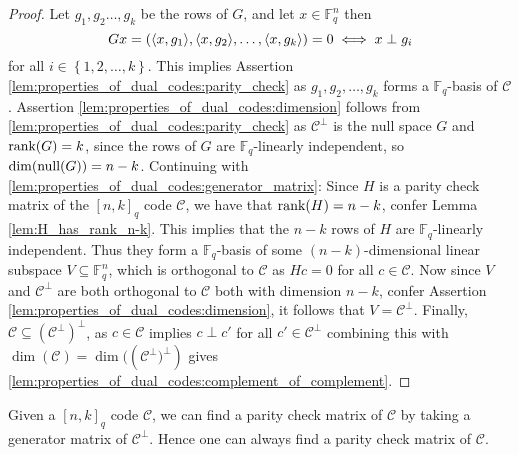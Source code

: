 \begin{proof}
  Let $g_1,g_{2} \ldots, g_{k}$ be the rows of $G$, and let $x \in \mathbb{F}_q^n$ then
  \begin{equation*}
  G x = (\langle x, g_{1}\rangle, \langle x, g_{2}\rangle, \ldots,  \langle x, g_{k}\rangle) = 0 \iff x \perp g_{i}
  \end{equation*}
  for all $i \in \left\{1, 2, \ldots, k\right\}$.
  This implies Assertion \ref{lem:properties_of_dual_codes:parity_check} as $g_{1}, g_{2}, \ldots, g_{k}$ forms a $\mathbb{F}_{q}$-basis of $\mathcal{C}$.
  Assertion \ref{lem:properties_of_dual_codes:dimension} follows from \ref{lem:properties_of_dual_codes:parity_check} as $\mathcal{C}^{\perp}$ is the null space $G$ and $\textnormal{rank}(G) = k$, since the rows of $G$ are $\mathbb{F}_q$-linearly independent, so $\dim(\textnormal{null}(G)) = n - k$.
  Continuing with \ref{lem:properties_of_dual_codes:generator_matrix}: Since $H$ is a parity check matrix of the $[n, k]_{q}$ code $\mathcal{C}$, we have that $\textnormal{rank}(H) = n - k$, confer Lemma \ref{lem:H_has_rank_n-k}. This implies that the $n -k$ rows of $H$ are $\mathbb{F}_{q}$-linearly independent. Thus they form a $\mathbb{F}_q$-basis of some $(n-k)$-dimensional linear subspace $V \subseteq \mathbb{F}_q^{n}$, which is orthogonal to $\mathcal{C}$ as $Hc = 0$ for all $c \in \mathcal{C}$. Now since $V$ and $\mathcal{C}^{\perp}$ are both orthogonal to $\mathcal{C}$ both with dimension $n - k$, confer Assertion \ref{lem:properties_of_dual_codes:dimension}, it follows that $V  = \mathcal{C}^{\perp}$.
  Finally, $\mathcal{C} \subseteq (\mathcal{C}^{\perp})^{\perp}$, as $c \in \mathcal{C}$ implies $c \perp c'$ for all $c' \in \mathcal{C}^{\perp}$ combining this with $\dim(\mathcal{C}) = \dim(\left(\mathcal{C}^{\perp})^{\perp}\right)$ gives \ref{lem:properties_of_dual_codes:complement_of_complement}.
\end{proof}


\begin{remark}
  Given a $[n, k]_{q}$ code $\mathcal{C}$, we can find a parity check matrix of $\mathcal{C}$ by taking a generator matrix of $\mathcal{C}^{\perp}$. Hence one can always find a parity check matrix of $\mathcal{C}$.
\end{remark}
